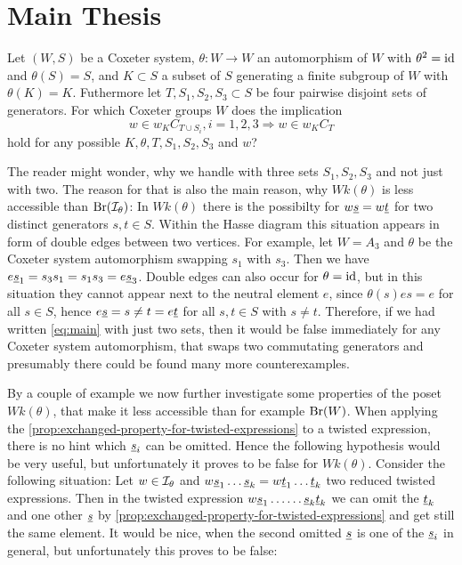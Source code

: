\section{Main Thesis}
\label{sec:main-thesis}

\begin{ques}
	Let $(W,S)$ be a Coxeter system, $\theta : W \to W$ an automorphism of $W$ with $\theta^2 = \operatorname{id}$ and $\theta(S) = S$, and $K \subset S$ a subset of $S$ generating a finite subgroup of $W$ with $\theta(K) = K$. Futhermore let $T,S_1,S_2,S_3 \subset S$ be four pairwise disjoint sets of generators. For which Coxeter groups $W$ does the implication
	\begin{equation}
		\label{eq:main}
		w \in w_K C_{T \cup S_i}, i=1,2,3 \Rightarrow w \in w_K C_T
	\end{equation}
	hold for any possible $K,\theta,T,S_1,S_2,S_3$ and $w$?
\end{ques}

The reader might wonder, why we handle with three sets $S_1,S_2,S_3$ and not just with two. The reason for that is also the main reason, why $Wk(\theta)$ is less accessible than $\operatorname{Br}(\mathcal{I}_{\theta})$: In $Wk(\theta)$ there is the possibilty for $w \underline{s} = w \underline{t}$ for two distinct generators $s,t \in S$. Within the Hasse diagram this situation appears in form of double edges between two vertices. For example, let $W = A_3$ and $\theta$ be the Coxeter system automorphism swapping $s_1$ with $s_3$. Then we have $e \underline{s}_1 = s_3 s_1 = s_1 s_3 = e \underline{s}_3$. Double edges can also occur for $\theta = \operatorname{id}$, but in this situation they cannot appear next to the neutral element $e$, since $\theta(s)es = e$ for all $s \in S$, hence $e \underline{s} = s \neq t = e \underline{t}$ for all $s,t \in S$ with $s \neq t$. Therefore, if we had written \ref{eq:main} with just two sets, then it would be false immediately for any Coxeter system automorphism, that swaps two commutating generators and presumably there could be found many more counterexamples.

By a couple of example we now further investigate some properties of the poset $Wk(\theta)$, that make it less accessible than for example $\operatorname{Br}(W)$. When applying the \ref{prop:exchanged-property-for-twisted-expressions} to a twisted expression, there is no hint which $\underline{s}_i$ can be omitted. Hence the following hypothesis would be very useful, but unfortunately it proves to be false for $Wk(\theta)$. Consider the following situation: Let $w \in \mathcal{I}_{\theta}$ and $w \underline{s}_1 \ldots \underline{s}_k = w \underline{t}_1 \ldots \underline{t}_k$ two reduced twisted expressions. Then in the twisted expression $w \underline{s}_1 \ldots \ldots \underline{s}_k \underline{t}_k$ we can omit the $\underline{t}_k$ and one other $\underline{s}$ by \ref{prop:exchanged-property-for-twisted-expressions} and get still the same element. It would be nice, when the second omitted $\underline{s}$ is one of the $\underline{s}_i$ in general, but unfortunately this proves to be false:

